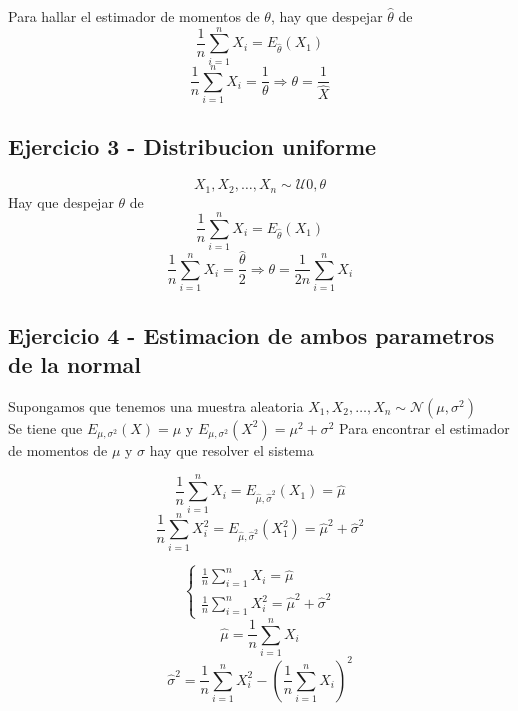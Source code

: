 \documentclass[a4paper]{article}
\begin{document}
Para hallar el estimador de momentos de $\theta$, hay que despejar $\widehat{\theta}$ de
\begin{equation*}
    \frac{1}{n} \sum_{i=1}^n X_{i} = E_{\widehat{\theta}}(X_{1})
\end{equation*}
\begin{equation*}
    \frac{1}{n} \sum_{i=1}^n X_{i} = \frac{1}{\mathcal{\theta}} \Rightarrow \mathcal{\theta} = \frac{1}{\widehat{X}}
\end{equation*}

\subsection{Ejercicio 3 - Distribucion uniforme}
\begin{equation*}
    X_{1}, X_{2}, \dots , X_{n} \sim \mathcal{U}{0, \theta}
\end{equation*}
Hay que despejar $\theta$ de
\begin{equation*}
    \frac{1}{n} \sum_{i=1}^n X_{i} = E_{\widehat{\theta}}(X_{1})
\end{equation*}
\begin{equation*}
    \frac{1}{n} \sum_{i=1}^n X_{i} = \frac{\widehat{\theta}}{2} \Rightarrow \mathcal{\theta} = \frac{1}{2n}\sum_{i=1}^{n} X_{i}
\end{equation*}

\subsection{Ejercicio 4 - Estimacion de ambos parametros de la normal}
Supongamos que tenemos una muestra aleatoria $X_{1}, X_{2},\dots,X_{n} \sim \mathcal{N}(\mu, \sigma^2)$ \\
Se tiene que $E_{\mu, \sigma^2}(X) = \mu$ y $E_{\mu, \sigma^2}(X^2) = \mu^2 + \sigma^2$
Para encontrar el estimador de momentos de $\mu$ y $\sigma$ hay que resolver el sistema

\begin{equation*}
    \frac{1}{n} \sum_{i=1}^n X_{i} = E_{\widehat{\mu}, \widehat{\sigma}^2}(X_{1}) = \widehat{\mu}
\end{equation*}
\begin{equation*}
    \frac{1}{n} \sum_{i=1}^n X_{i}^2 = E_{\widehat{\mu}, \widehat{\sigma}^2}(X_{1}^2) = \widehat{\mu}^2 + \widehat{\sigma}^2
\end{equation*}

\begin{equation*}
    \begin{cases}
        \frac{1}{n} \sum_{i=1}^n X_{i} = \widehat{\mu}
        \\
        \frac{1}{n} \sum_{i=1}^n X_{i}^2 = \widehat{\mu}^2 + \widehat{\sigma}^2
        \end{cases}
\end{equation*}
\begin{equation*}
    \widehat{\mu} = \frac{1}{n} \sum_{i=1}^n X_{i}
\end{equation*}
\begin{equation*}
    \widehat{\sigma}^2 = \frac{1}{n} \sum_{i=1}^n X_{i}^2 - (\frac{1}{n} \sum_{i=1}^n X_{i})^2
\end{equation*}
\end{document}
